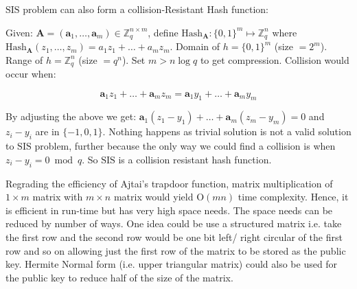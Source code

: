 

\begin{plain}
\normalfont
$\mathrm{SIS}$ problem can also form a collision-Resistant Hash function:

Given: $\textbf{A}=(\textbf{a}_1,\dots,\textbf{a}_m) \in \mathbb{Z}^{n\times m}_{q}$, define $\mathrm{Hash}_{\textbf{A}}: \{0,1\}^{m} \mapsto \mathbb{Z}^{n}_{q}$ where $\mathrm{Hash}_{\textbf{A}}(z_1, \dots,z_m) = a_1 z_1 + \dots + a_m z_m$. Domain of $h = \{0,1\}^{m}$ (size $= 2^m$). Range of $h = \mathbb{Z}^{n}_{q}$ (size $= q^n$). Set $m > n\log q$ to get compression. Collision would occur when:

\begin{equation}
\textbf{a}_1z_1 + \dots + \textbf{a}_mz_m = \textbf{a}_1y_1 + \dots + \textbf{a}_my_m
\end{equation}

By adjusting the above we get: $\textbf{a}_1(z_1-y_1) + \dots + \textbf{a}_m(z_m-y_m) = 0$ and $z_i-y_i$ are in $\{-1,0,1\}$. Nothing happens as trivial solution is not a valid solution to $\mathrm{SIS}$ problem, further because the only way we could find a collision is when $z_i-y_i = 0 \bmod q$. So $\mathrm{SIS}$ is a collision resistant hash function.  
\end{plain}

Regrading the efficiency of Ajtai's trapdoor function, matrix multiplication of $1 \times m$ matrix with $m \times n$ matrix would yield $\text{O}( m n)$ time complexity. Hence, it is efficient in run-time but has very high space needs. The space needs can be reduced by number of ways. One idea could be use a structured matrix i.e. take the first row and the second row would be one bit left/ right circular of the first row and so on allowing just the first row of the matrix to be stored as the public key. Hermite Normal form (i.e. upper triangular matrix) could also be used for the public key to reduce half of the size of the matrix.


